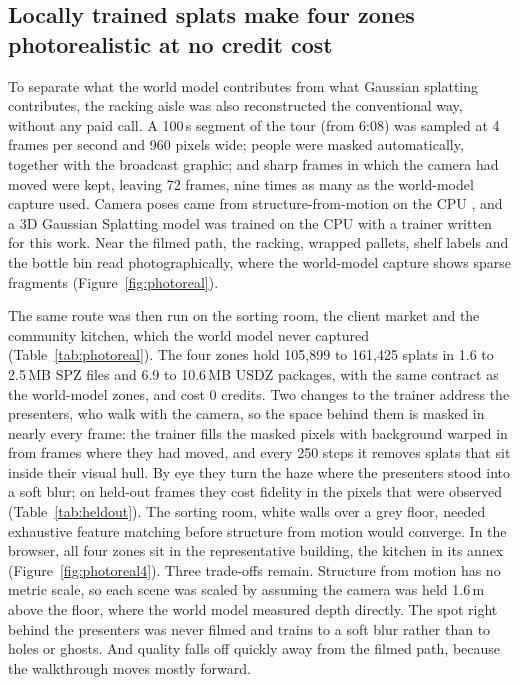 \documentclass{article}
\begin{document}
\subsection{Locally trained splats make four zones photorealistic at no credit cost}
To separate what the world model contributes from what Gaussian splatting
contributes, the racking aisle was also reconstructed the conventional way,
without any paid call. A 100\,s segment of the tour (from 6:08) was sampled at
4 frames per second and 960 pixels wide; people were masked automatically,
together with the broadcast graphic; and sharp frames in which the camera had
moved were kept, leaving 72 frames, nine times as many as the world-model
capture used. Camera poses came from structure-from-motion on the CPU
\cite{schoenberger2016sfm,colmap}, and a 3D Gaussian Splatting model
\cite{kerbl20233d} was trained on the CPU with a trainer written for this work.
Near the filmed path, the racking, wrapped pallets, shelf labels and the bottle
bin read photographically, where the world-model capture shows sparse
fragments (Figure~\ref{fig:photoreal}).

The same route was then run on the sorting room, the client market and the
community kitchen, which the world model never captured (Table~\ref{tab:photoreal}).
The four zones hold 105{,}899 to 161{,}425 splats in 1.6 to 2.5\,MB SPZ files
and 6.9 to 10.6\,MB USDZ packages, with the same contract as the world-model
zones, and cost 0 credits. Two changes to the trainer address the
presenters, who walk with the camera, so the space behind them is masked in
nearly every frame: the trainer fills the masked pixels with background warped
in from frames where they had moved, and every 250 steps it removes splats
that sit inside their visual hull. By eye they turn the haze where the
presenters stood into a soft blur; on held-out frames they cost fidelity in
the pixels that were observed (Table~\ref{tab:heldout}). The
sorting room, white walls over a grey floor, needed exhaustive feature
matching before structure from motion would converge. In the browser, all four
zones sit in the representative building, the kitchen in its annex
(Figure~\ref{fig:photoreal4}). Three trade-offs remain. Structure from
motion has no metric scale, so each scene was scaled by assuming the camera
was held 1.6\,m above the floor, where the world model measured depth
directly. The spot right behind the presenters was never filmed and trains to
a soft blur rather than to holes or ghosts. And quality falls off quickly away
from the filmed path, because the walkthrough moves mostly forward.
\end{document}
